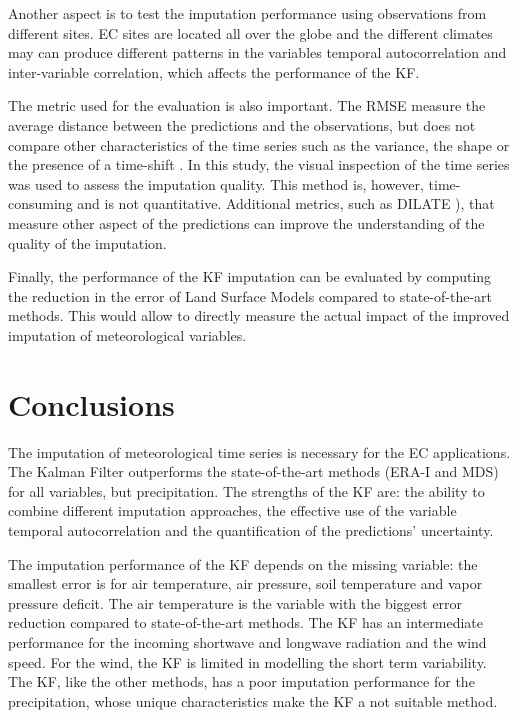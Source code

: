 \documentclass{article}
\let\Oldsection\section
\renewcommand{\section}{\FloatBarrier\Oldsection}
\begin{document}
Another aspect is to test the imputation performance using observations from different sites. EC sites are located all over the globe \cite{pastorello_fluxnet2015_2020} and the different climates may can produce different patterns in the variables temporal autocorrelation and inter-variable correlation, which affects the performance of the KF.

The metric used for the evaluation is also important. The RMSE measure the average distance between the predictions and the observations, but does not compare other characteristics of the time series such as the variance, the shape or the presence of a time-shift \cite{guen_shape_nodate}. In this study, the visual inspection of the time series was used to assess the imputation quality. This method is, however, time-consuming and is not quantitative. Additional metrics, such as DILATE \cite{guen_shape_nodate}), that measure other aspect of the predictions can improve the understanding of the quality of the imputation.

Finally, the performance of the KF imputation can be evaluated by computing the reduction in the error of Land Surface Models compared to state-of-the-art methods. This would allow to directly measure the actual impact of the improved imputation of meteorological variables. 


\section{Conclusions}

The imputation of meteorological time series is necessary for the EC applications. The Kalman Filter outperforms the state-of-the-art methods (ERA-I and MDS) for all variables, but precipitation. The strengths of the KF are: the ability to combine different imputation approaches, the effective use of the variable temporal autocorrelation and the quantification of the predictions' uncertainty. 

The imputation performance of the KF depends on the missing variable: the smallest error is for air temperature, air pressure, soil temperature and vapor pressure deficit. The air temperature is the variable with the biggest error reduction compared to state-of-the-art methods. The KF has an intermediate performance for the incoming shortwave and longwave radiation and the wind speed. For the wind, the KF is limited in modelling the short term variability. The KF, like the other methods, has a poor imputation performance for the precipitation, whose unique characteristics make the KF a not suitable method.
\end{document}
